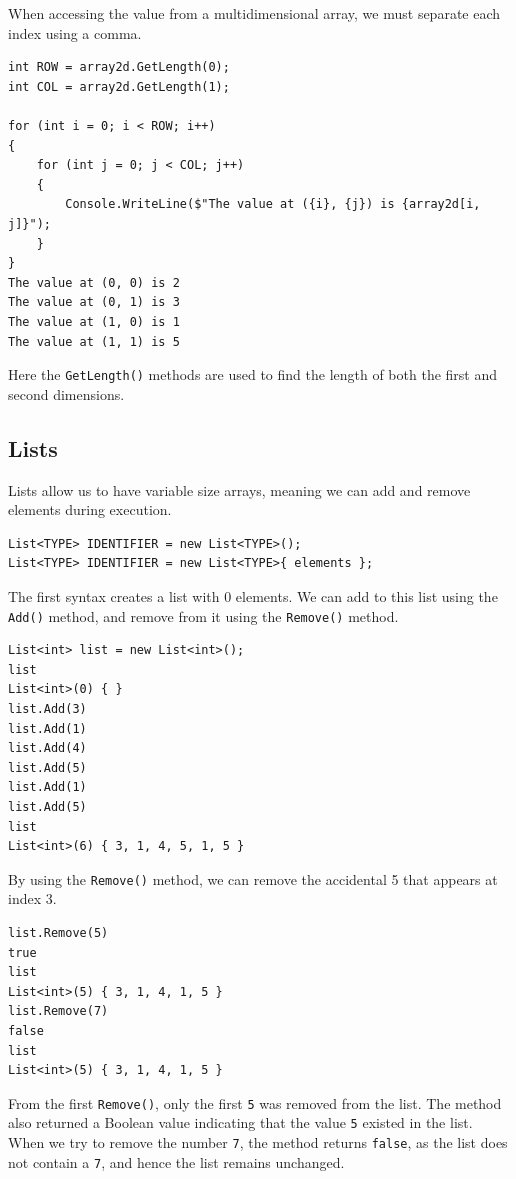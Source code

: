 \documentclass{article}
\def\customlinemarker#1#2{
    \edef\thelstnumber{%
        \unexpanded{%
            \ifnum#1=\value{lstnumber}\relax
              #2%
            \fi}%
        \ifx\thelstnumber\relax\else
        \expandafter\unexpanded\expandafter{\thelstnumber}%
        \fi
    }
}
\begin{document}
When accessing the value from a multidimensional array,
we must separate each index using a comma.
\begingroup
\let\thelstnumber\relax
\customlinemarker{1}{\$}
\customlinemarker{2}{\$}
\customlinemarker{4}{\$}
\customlinemarker{5}{.}
\customlinemarker{6}{.}
\customlinemarker{7}{.}
\customlinemarker{8}{.}
\customlinemarker{9}{.}
\customlinemarker{10}{.}
\begin{lstlisting}
int ROW = array2d.GetLength(0);
int COL = array2d.GetLength(1);

for (int i = 0; i < ROW; i++)
{
    for (int j = 0; j < COL; j++)
    {
        Console.WriteLine($"The value at ({i}, {j}) is {array2d[i, j]}");
    }
}
The value at (0, 0) is 2
The value at (0, 1) is 3
The value at (1, 0) is 1
The value at (1, 1) is 5
\end{lstlisting}
\endgroup
Here the \lstinline{GetLength()} methods are used to find the length
of both the first and second dimensions.
\subsection{Lists}
Lists allow us to have variable size arrays, meaning we can
add and remove elements during execution.
\begin{lstlisting}[numbers=none]
List<TYPE> IDENTIFIER = new List<TYPE>();
List<TYPE> IDENTIFIER = new List<TYPE>{ elements };
\end{lstlisting}
The first syntax creates a list with 0 elements.
We can add to this list using the \lstinline{Add()} method, and
remove from it using the \lstinline{Remove()} method.
\begingroup
\let\thelstnumber\relax
\customlinemarker{1}{\$}
\customlinemarker{2}{\$}
\customlinemarker{4}{\$}
\customlinemarker{5}{\$}
\customlinemarker{6}{\$}
\customlinemarker{7}{\$}
\customlinemarker{8}{\$}
\customlinemarker{9}{\$}
\customlinemarker{10}{\$}
\begin{lstlisting}
List<int> list = new List<int>();
list
List<int>(0) { }
list.Add(3)
list.Add(1)
list.Add(4)
list.Add(5)
list.Add(1)
list.Add(5)
list
List<int>(6) { 3, 1, 4, 5, 1, 5 }
\end{lstlisting}
\endgroup
By using the \lstinline{Remove()} method, we can remove the
accidental 5 that appears at index 3.
\begingroup
\let\thelstnumber\relax
\customlinemarker{1}{\$}
\customlinemarker{3}{\$}
\customlinemarker{5}{\$}
\customlinemarker{7}{\$}
\begin{lstlisting}
list.Remove(5)
true
list
List<int>(5) { 3, 1, 4, 1, 5 }
list.Remove(7)
false
list
List<int>(5) { 3, 1, 4, 1, 5 }
\end{lstlisting}
\endgroup
From the first \lstinline{Remove()},
only the first \lstinline{5} was removed from the list.
The method also returned a Boolean value indicating that the value
\lstinline{5} existed in the list. When we try to remove the
number \lstinline{7}, the method returns \lstinline{false},
as the list does not contain a \lstinline{7}, and hence the
list remains unchanged.
\end{document}
